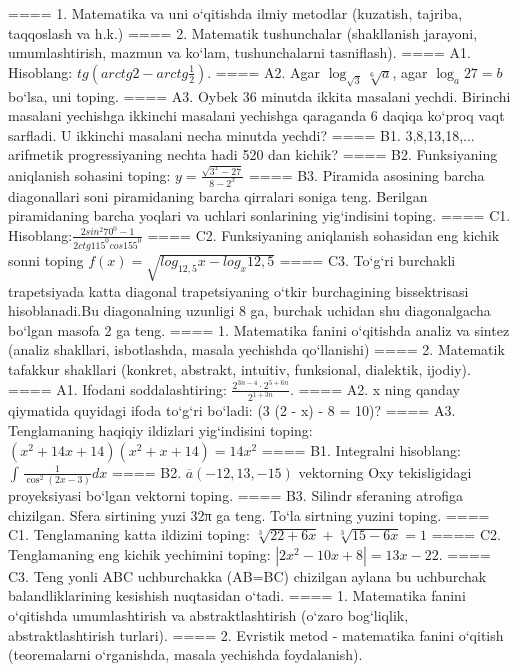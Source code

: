 ====
1. Matematika va uni o‘qitishda ilmiy metodlar (kuzatish, tajriba, taqqoslash va h.k.)
====
2. Matematik tushunchalar (shakllanish jarayoni, umumlashtirish, mazmun va ko‘lam, tushunchalarni tasniflash).
====
A1. Hisoblang: \(tg\left (arctg2 - arctg\frac{1}{2} \right) \).
====
A2. Agar \(\log_{\sqrt{3}}\sqrt[6]{a}\), agar \(\log_{a}27 = b\) bo‘lsa, uni toping.
====
A3. Oybek 36 minutda ikkita masalani yechdi. Birinchi masalani yechishga ikkinchi masalani yechishga qaraganda 6 daqiqa ko‘proq vaqt sarfladi. U ikkinchi masalani necha minutda yechdi?
====
B1. 3,8,13,18,... arifmetik progressiyaning nechta hadi 520 dan kichik?
====
B2. Funksiyaning aniqlanish sohasini toping: \(y = \frac{\sqrt{3^{x} - 27}}{8 - 2^{x}}\)
====
B3. Piramida asosining barcha diagonallari soni piramidaning barcha qirralari soniga teng. Berilgan piramidaning barcha yoqlari va uchlari sonlarining yig‘indisini toping.
====
C1. Hisoblang:\(\frac{2sin^{2}70^{0} - 1}{2ctg115^{0}cos155^{0}}\)
====
C2. Funksiyaning aniqlanish sohasidan eng kichik sonni toping \(f (x) = \sqrt{log_{12,5}x - log_{x}12,5}\)
====
C3. To‘g‘ri burchakli trapetsiyada katta diagonal trapetsiyaning o‘tkir burchagining bissektrisasi hisoblanadi.Bu diagonalning uzunligi 8 ga, burchak uchidan shu diagonalgacha bo‘lgan masofa 2 ga teng.
====
1. Matematika fanini o‘qitishda analiz va sintez (analiz shakllari, isbotlashda, masala yechishda qo‘llanishi)
====
2. Matematik tafakkur shakllari (konkret, abstrakt, intuitiv, funksional, dialektik, ijodiy).
====
A1. Ifodani soddalashtiring: \(\frac{2^{3n - 4} \cdot 2^{5 + 6n}}{2^{1 + 3n}}\).
====
A2. x ning qanday qiymatida quyidagi ifoda to‘g‘ri bo‘ladi: (3 (2 - x) - 8 = 10)?
====
A3. Tenglamaning haqiqiy ildizlari yig‘indisini toping: \((x^2 + 14x + 14) (x^2 + x + 14) = 14x^2\)
====
B1. Integralni hisoblang: \(\int_{}^{}{\frac{1}{\cos^{2} (2x - 3) }dx}\)
====
B2. \(\overline{a} (- 12,13, - 15) \) vektorning Oxy tekisligidagi proyeksiyasi bo‘lgan vektorni toping.
====
B3. Silindr sferaning atrofiga chizilgan. Sfera sirtining yuzi 32π ga teng. To‘la sirtning yuzini toping.
====
C1. Tenglamaning katta ildizini toping: \(\sqrt[3]{22 + 6x} + \sqrt[3]{15 - 6x} = 1\)
====
C2. Tenglamaning eng kichik yechimini toping: \(\left| 2x^2 - 10x + 8 \right| = 13x - 22\).
====
C3. Teng yonli ABC uchburchakka (AB=BC) chizilgan aylana bu uchburchak balandliklarining kesishish nuqtasidan o‘tadi.
====
1. Matematika fanini o‘qitishda umumlashtirish va abstraktlashtirish (o‘zaro bog‘liqlik, abstraktlashtirish turlari).
====
2. Evristik metod - matematika fanini o‘qitish (teoremalarni o‘rganishda, masala yechishda foydalanish).
